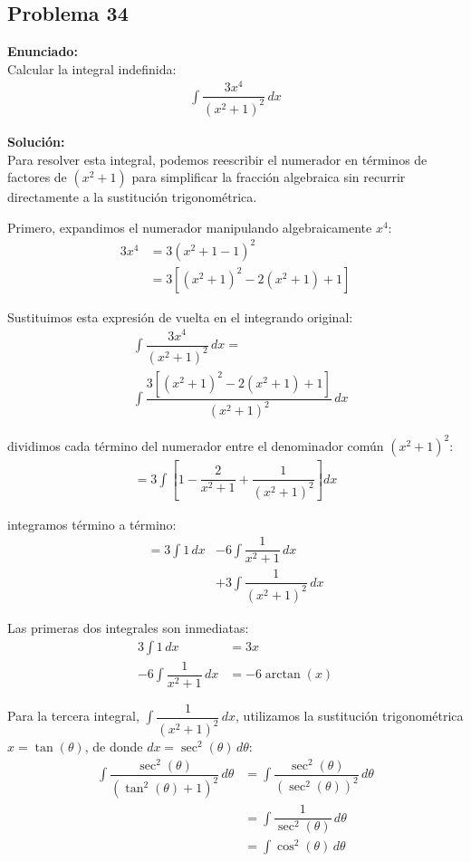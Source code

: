\subsection*{Problema 34}

\textbf{Enunciado:} \\
Calcular la integral indefinida:
\begin{align*}
\int \dfrac{3x^4}{(x^2 + 1)^2} \, dx
\end{align*}

\textbf{Solución:} \\
Para resolver esta integral, podemos reescribir el numerador en términos de factores de $(x^2 + 1)$ para simplificar la fracción algebraica sin recurrir directamente a la sustitución trigonométrica.

Primero, expandimos el numerador manipulando algebraicamente $x^4$:
\begin{align*}
3x^4 &= 3(x^2 + 1 - 1)^2 \\
&= 3\left[(x^2 + 1)^2 - 2(x^2 + 1) + 1\right]
\end{align*}

Sustituimos esta expresión de vuelta en el integrando original:
\begin{align*}
&\int \dfrac{3x^4}{(x^2 + 1)^2} \, dx = \\
&\int \dfrac{3\left[(x^2 + 1)^2 - 2(x^2 + 1) + 1\right]}{(x^2 + 1)^2} \, dx
\end{align*}

dividimos cada término del numerador entre el denominador común $(x^2 + 1)^2$:
\begin{align*}
= 3 \int \left[ 1 - \dfrac{2}{x^2 + 1} + \dfrac{1}{(x^2 + 1)^2} \right] dx
\end{align*}

integramos término a término:
\begin{align*}
= 3 \int 1 \, dx &- 6 \int \dfrac{1}{x^2 + 1} \, dx \\
&+ 3 \int \dfrac{1}{(x^2 + 1)^2} \, dx
\end{align*}

Las primeras dos integrales son inmediatas:
\begin{align*}
3 \int 1 \, dx &= 3x \\
-6 \int \dfrac{1}{x^2 + 1} \, dx &= -6 \arctan(x)
\end{align*}

Para la tercera integral, $\int \dfrac{1}{(x^2 + 1)^2} \, dx$, utilizamos la sustitución trigonométrica $x = \tan(\theta)$, de donde $dx = \sec^2(\theta) \, d\theta$:
\begin{align*}
\int \dfrac{\sec^2(\theta)}{(\tan^2(\theta) + 1)^2} \, d\theta &= \int \dfrac{\sec^2(\theta)}{(\sec^2(\theta))^2} \, d\theta \\
&= \int \dfrac{1}{\sec^2(\theta)} \, d\theta \\
&= \int \cos^2(\theta) \, d\theta
\end{align*}


